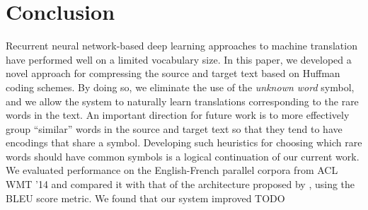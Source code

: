 \section{Conclusion}
\label{sec:conclusion}

Recurrent neural network-based deep learning approaches
to machine translation have performed well on a limited vocabulary
size. In this paper, we developed a novel approach for compressing
the source and target text based on Huffman coding schemes. By doing
so, we eliminate the use of the \emph{unknown word} symbol,
and we allow the system to naturally learn translations corresponding
to the rare words in the text. An important direction for future work is to more effectively
group ``similar'' words in the source and target text so that they tend to have
encodings that share a symbol. Developing such heuristics for choosing which rare words should have common symbols
is a logical continuation of our current work. We evaluated performance on the English-French
parallel corpora from ACL WMT '14 and compared it with that of the architecture
proposed by , using the BLEU score metric.
We found that our system improved TODO\\